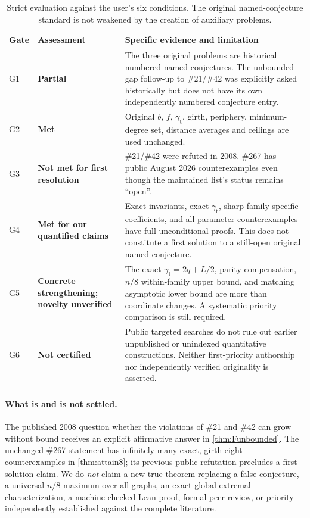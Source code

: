 \documentclass[11pt,a4paper]{article}
\theoremstyle{definition}
\theoremstyle{remark}
\newcommand{\gam}{\gamma_{\mathrm t}}
\begin{document}
\begin{table}[H]
\centering\small
\begin{tabularx}{\textwidth}{@{}p{}p{}X@{}}
\toprule
Gate & Assessment & Specific evidence and limitation\\
\midrule
G1 & \textbf{Partial} & The three original problems are historical numbered named conjectures. The unbounded-gap follow-up to \#21/\#42 was explicitly asked historically but does not have its own independently numbered conjecture entry.\\
G2 & \textbf{Met} & Original $b$, $f$, $\gam$, girth, periphery, minimum-degree set, distance averages and ceilings are used unchanged.\\
G3 & \textbf{Not met for first resolution} & \#21/\#42 were refuted in 2008. \#267 has public August 2026 counterexamples even though the maintained list's status remains ``open''.\\
G4 & \textbf{Met for our quantified claims} & Exact invariants, exact $\gam$, sharp family-specific coefficients, and all-parameter counterexamples have full unconditional proofs. This does not constitute a first solution to a still-open original named conjecture.\\
G5 & \textbf{Concrete strengthening; novelty unverified} & The exact $\gam=2q+L/2$, parity compensation, $n/8$ within-family upper bound, and matching asymptotic lower bound are more than coordinate changes. A systematic priority comparison is still required.\\
G6 & \textbf{Not certified} & Public targeted searches do not rule out earlier unpublished or unindexed quantitative constructions. Neither first-priority authorship nor independently verified originality is asserted.\\
\bottomrule
\end{tabularx}
\caption{Strict evaluation against the user's six conditions. The original named-conjecture standard is not weakened by the creation of auxiliary problems.}
\label{tab:gates}
\end{table}

\paragraph{What is and is not settled.} The published 2008 question whether the violations of \#21 and \#42 can grow without bound receives an explicit affirmative answer in \cref{thm:Funbounded}. The unchanged \#267 statement has infinitely many exact, girth-eight counterexamples in \cref{thm:attain8}; its previous public refutation precludes a first-solution claim. We do \emph{not} claim a new true theorem replacing a false conjecture, a universal $n/8$ maximum over all graphs, an exact global extremal characterization, a machine-checked Lean proof, formal peer review, or priority independently established against the complete literature.
\end{document}
